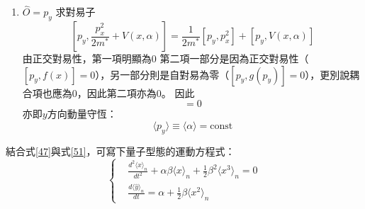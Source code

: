 \documentclass[12pt]{article}
\begin{document}
\begin{enumerate}
\begin{align}
    \left[y,V(x,\alpha)\right]&=i\hbar\frac{\partial}{\partial p_y}\left(\frac{1}{2}m^*\alpha^2 + \frac{1}{2}m^*\alpha\beta x^2 + \frac{1}{8}m^*\beta^2 x^4\right)\nonumber\\&=i\hbar\frac{\partial}{\partial\alpha}\left(\frac{1}{2}m^*\alpha^2 + \frac{1}{2}m^*\alpha\beta x^2 + \frac{1}{8}m^*\beta^2 x^4\right)\cdot\frac{\partial\alpha}{\partial p_y}\nonumber\\&=\frac{i\hbar} {m^*}\frac{\partial}{\partial\alpha}\left(\frac{1}{2}m^*\alpha^2 + \frac{1}{2}m^*\alpha\beta x^2 + \frac{1}{8}m^*\beta^2 x^4\right)\nonumber\\&=\frac{i\hbar}{m^*}\left(m^*\alpha+\frac12m^*\beta x^2\right)\nonumber\\&=i\hbar\left(\alpha+\frac12\beta x^2\right)
\end{align}
因此
\begin{equation}
    [y,H]=i\hbar\left(\alpha+\frac12\beta x^2\right)
\end{equation}
帶回 Ehrenfest thrm，得：
\begin{align}
    &\frac{d\langle\hat{y}\rangle}{dt}=\frac{1}{i\hbar}\cdot i\hbar\left\langle\alpha+\frac12\beta x^2\right\rangle=\alpha+\frac12\beta\langle x^2\rangle\nonumber \\
    &\to\frac{d\langle\hat{y}\rangle}{dt}=\alpha+\frac12\beta\langle x^2\rangle
\end{align}
量子化：
\begin{equation}
    \frac{d\langle\hat{y}\rangle_n}{dt}=\alpha+\frac12\beta\langle x^2\rangle_n\label{51}
\end{equation}
洽對應式\eqref{18}
    \item $\hat{O}=p_y$
\newline\noindent
求對易子
\begin{equation*}
    \left[p_y,\frac{p_x^2}{2m^*}+V(x,\alpha)\right]=\frac{1}{2m^*}\left[p_y,p_x^2\right]+\left[p_y,V(x,\alpha)\right]
\end{equation*}
由正交對易性，第一項明顯為0
\newline\noindent
第二項一部分是因為正交對易性（$[p_y,f(x)]=0$），另一部分則是自對易為零（$[p_y,g(p_y)]=0$），更別說耦合項也應為0，因此第二項亦為0。
\newline\noindent
因此
\begin{equation}
    [p_y,H]=0
\end{equation}
亦即$y$方向動量守恆：
\begin{equation}
    \langle p_y\rangle\equiv\langle\alpha\rangle=\text{const}
\end{equation}
\end{enumerate}
結合式\eqref{47}與式\eqref{51}，可寫下量子型態的運動方程式：{\color{red}
\begin{equation}
    \left\{
    \begin{aligned}
        &\frac{d^2\langle x\rangle_n}{dt^2}+\alpha\beta\langle x\rangle_n+\frac12\beta^2\langle x^3\rangle_n=0 \\
        &\frac{d\langle\hat{y}\rangle_n}{dt}=\alpha+\frac12\beta\langle x^2\rangle_n
    \end{aligned}
    \right.
\end{equation}
}
\end{document}
